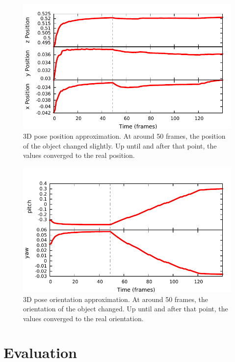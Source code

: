 \begin{figure}[H]
  \includegraphics[width=1.0\textwidth]{images/3D-poses-position.pdf}
  \caption[3D poses position convergence]{3D pose position approximation. At around 50 frames, the position of the object changed slightly. Up until and after that point, the values converged to the real position.}
\end{figure}

\begin{figure}[H]
  \includegraphics[width=1.0\textwidth]{images/3D-poses-orientation.pdf}
  \caption[3D poses orientation convergence]{3D pose orientation approximation. At around 50 frames, the orientation of the object changed. Up until and after that point, the values converged to the real orientation.}
\end{figure}

\section{Evaluation}


